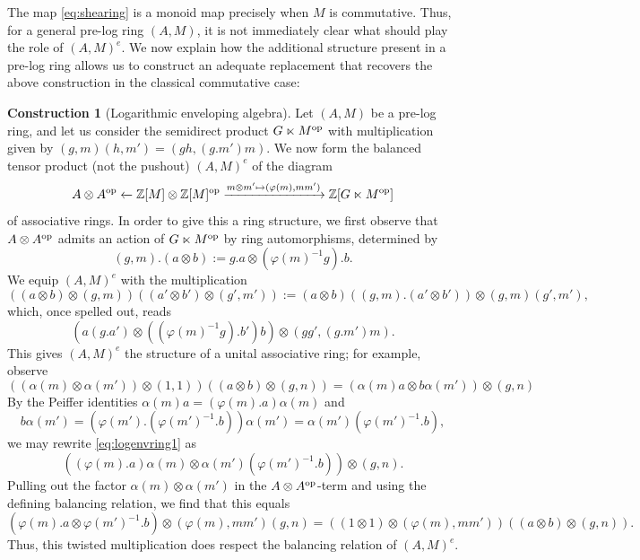 \documentclass[a4paper,10pt%
]{amsart}
\numberwithin{equation}{section}
\theoremstyle{definition}
\newtheorem{construction}[subsection]{Construction}
\renewcommand{\:}{\colon}
\begin{document}
The map \eqref{eq:shearing} is a monoid map precisely when $M$ is commutative. Thus, for a general pre-log ring $(A, M)$, it is not immediately clear what should play the role of $(A, M)^e$. We now explain how the additional structure present in a pre-log ring allows us to construct an adequate replacement that recovers the above construction in the classical commutative case: 

\begin{construction}[Logarithmic enveloping algebra] Let $(A, M)$ be a pre-log ring, and let us consider the semidirect product $G \ltimes M^{\rm op}$ with multiplication given by $(g, m)(h, m') = (gh, (g.m')m)$. We now form the balanced tensor product (not the pushout) $(A, M)^e$ of the diagram \[A \otimes A^{\rm op} \xleftarrow{} {\Bbb Z}[M] \otimes {\Bbb Z}[M]^{\rm op} \xrightarrow{m \otimes m' \mapsto (\varphi(m), mm')} {\Bbb Z}[G \ltimes M^{\rm op}]\] of associative rings. In order to give this a ring structure, we first observe that $A \otimes A^{\rm op}$ admits an action of $G \ltimes M^{\rm op}$ by ring automorphisms, determined by \begin{equation}\label{eq:aaopaction}(g, m).(a \otimes b) := g.a \otimes (\varphi(m)^{-1}g).b.\end{equation} We equip $(A, M)^e$ with the multiplication \[((a \otimes b) \otimes (g, m))((a' \otimes b') \otimes (g', m')) := (a \otimes b)((g, m).(a' \otimes b')) \otimes (g, m)(g', m'),\] which, once spelled out, reads \[(a(g.a') \otimes ((\varphi(m)^{-1}g).b')b) \otimes (gg', (g.m')m).\] This gives $(A, M)^e$ the structure of a unital associative ring; for example, observe \begin{equation}\label{eq:logenvring1}((\alpha(m) \otimes \alpha(m')) \otimes (1, 1))((a \otimes b) \otimes (g, n)) = (\alpha(m)a \otimes b\alpha(m')) \otimes (g, n)\end{equation} By the Peiffer identities $\alpha(m)a = (\varphi(m).a)\alpha(m)$ and \[b\alpha(m') = (\varphi(m').(\varphi(m')^{-1}.b))\alpha(m') = \alpha(m')(\varphi(m')^{-1}.b),\] we may rewrite \eqref{eq:logenvring1} as \[((\varphi(m).a)\alpha(m) \otimes \alpha(m')(\varphi(m')^{-1}.b)) \otimes (g, n).\] Pulling out the factor $\alpha(m) \otimes \alpha(m')$ in the $A \otimes A^{\rm op}$-term and using the defining balancing relation, we find that this equals \[(\varphi(m).a \otimes \varphi(m')^{-1}.b) \otimes (\varphi(m), mm')(g, n) = ((1 \otimes 1) \otimes (\varphi(m), mm'))((a \otimes b) \otimes (g, n)).\] Thus, this twisted multiplication does respect the balancing relation of $(A, M)^e$. 
\end{construction}
\end{document}
